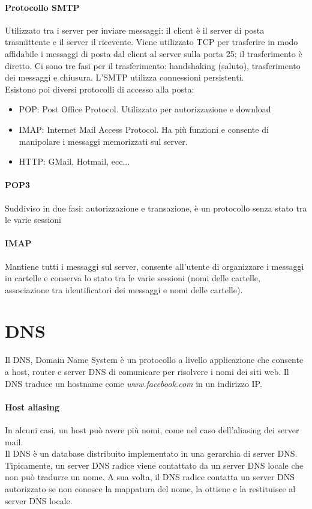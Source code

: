 \documentclass{report}
\begin{document}
	\paragraph{Protocollo SMTP} Utilizzato tra i server per inviare messaggi: il client è il server di posta trasmittente e il server il ricevente. Viene utilizzato TCP per trasferire in modo affidabile i messaggi di posta dal client al server sulla porta 25; il trasferimento è diretto. Ci sono tre fasi per il trasferimento: handshaking (saluto), trasferimento dei messaggi e chiusura. L'SMTP utilizza connessioni persistenti.
	\medskip\\Esistono poi diversi protocolli di accesso alla posta:
	\begin{itemize}
		\item POP: Post Office Protocol. Utilizzato per autorizzazione e download
		\item IMAP: Internet Mail Access Protocol. Ha più funzioni e consente di manipolare i messaggi memorizzati sul server.
		\item HTTP: GMail, Hotmail, ecc...
	\end{itemize}
	\paragraph{POP3} Suddiviso in due fasi: autorizzazione e transazione, è un protocollo senza stato tra le varie sessioni
	\paragraph{IMAP} Mantiene tutti i messaggi sul server, consente all'utente di organizzare i messaggi in cartelle e conserva lo stato tra le varie sessioni (nomi delle cartelle, associazione tra identificatori dei messaggi e nomi delle cartelle).
	\section{DNS}
	Il DNS, Domain Name System è un protocollo a livello applicazione che consente a host, router e server DNS di comunicare per risolvere i nomi dei siti web. Il DNS traduce un hostname come \textit{www.facebook.com} in un indirizzo IP.
	\paragraph{Host aliasing} In alcuni casi, un host può avere più nomi, come nel caso dell'aliasing dei server mail.
	\medskip\\Il DNS è un database distribuito implementato in una gerarchia di server DNS. Tipicamente, un server DNS radice viene contattato da un server DNS locale che non può tradurre un nome. A sua volta, il DNS radice contatta un server DNS autorizzato se non conosce la mappatura del nome, la ottiene e la restituisce al server DNS locale.
\end{document}
